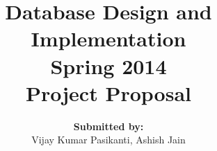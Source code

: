 \documentclass[12pt,letterpaper, one-sided]{article}
\newcommand\course{Database Design and Implementation}
\newcommand\semester{Spring 2014}     %
\newcommand\yourname{Vijay Kumar Pasikanti} %
\newcommand\testname{Project Proposal}
\newenvironment{answer}[1]{
  \subsection*{#1}
}
\begin{document}
\title{\large{\textbf{\Large\course}\\ \semester \\\textbf{\testname}}}
\author{\textbf{Submitted by:} \\ \yourname, Ashish Jain}
\maketitle

\begin{answer}{Problem statement:}
	\begin{enumerate}
	\item
	Performance evaluation of a clustering algorithm(?) on two different database systems.
	\item
	System scalability evaluation on varying magnitude of dataset size.
	\item
	Data used is generated using a synthetic graph generators during testing and evaluation, along with a social networks data from google+.
	\item
	Evaluation: 
		\begin{enumerate}
		\item
		Accuracy of the algorithm on varying data size with respect to each database system.
		\item
		Average system runtime of the algorithm per dataset with respect to each database system.
		\item
		Max/avg memory consumption per dataset with respect to each database system.
		\end{enumerate}
	\end{enumerate}
\end{answer}

\begin{answer}{Goal and motivation:}

\end{answer}

\begin{answer}{Related work survey:}

\end{answer}

\begin{answer}{Milestones:}	
	\begin{enumerate}
	\item
	System setup
	\item
	Algorithm implementation
	\item
	Evaluation on synthetic data
	\item
	Evaluation on google+ data
	\end{enumerate}
\end{answer}

\begin{answer}{References:}
	\begin{enumerate}
	\item
	Paper1
	\item
	Paper2
	\end{enumerate}
\end{answer}
\end{document}
